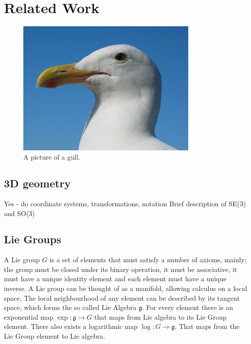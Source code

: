 \chapter{Related Work}
\label{chapter:Related_Work}

\begin{figure}[h!]
  \centering
    \includegraphics[width=0.8\textwidth]{chapters/images/gull}
  \caption{A picture of a gull.}
\end{figure}

\section{3D geometry}

Yes  - do coordinate systems, transformations, notation
Brief description of SE(3) and SO(3)

\section{Lie Groups}
\label{sec:lie_group}

A Lie group $G$ is a set of elements that must satisfy a number of axioms, mainly; the group must be closed under its binary operation, it must be associative, it must have a unique identity element and each element must have a unique inverse.  A Lie group can be thought of as a manifold, allowing calculus on a local space.  The local neighbourhood of any element can be described by its tangent space, which forms the so called Lie Algebra $\mathfrak g$.  For every element there is an exponential map $\exp\colon \mathfrak g \to G$ that maps from Lie algebra to its Lie Group element.  There also exists a logarithmic map $\log\colon G \to \mathfrak g$.  That maps from the Lie Group element to Lie algebra.

